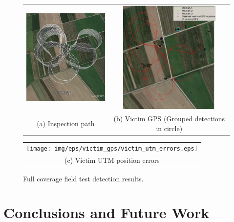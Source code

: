 \documentclass[runningheads]{llncs}
\begin{document}
\begin{figure}[!ht]
  \centering
  \begin{tabular}{cc}
    \hspace{-0.5cm}
    \includegraphics[width=5cm]{img/eps/victim_gps/SIP.eps} &
    \includegraphics[width=5cm]{img/eps/victim_gps/SIP_detections_map.eps} \\
    \small (a) Inspection path & 
    \small (b) Victim GPS \tiny (Grouped detections in circle)
  \end{tabular}

  \vspace{\floatsep}
  
  \begin{tabular}{c}
    \texttt{[image: img/eps/victim\_gps/victim\_utm\_errors.eps]} \\
    \small (c) Victim UTM position errors
  \end{tabular}

  \caption{Full coverage field test detection results.}\label{fig:victim_gps}
\end{figure}



\section{Conclusions and Future Work}
\end{document}
